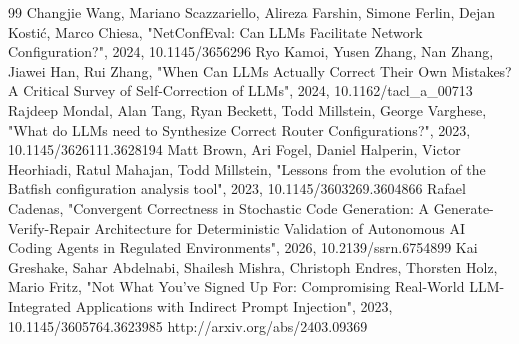 \documentclass[conference]{IEEEtran}
\begin{document}
\begin{thebibliography}{99}
 Changjie Wang, Mariano Scazzariello, Alireza Farshin, Simone Ferlin, Dejan Kostić, Marco Chiesa, "NetConfEval: Can LLMs Facilitate Network Configuration?", 2024, 10.1145/3656296
 Ryo Kamoi, Yusen Zhang, Nan Zhang, Jiawei Han, Rui Zhang, "When Can LLMs Actually Correct Their Own Mistakes? A Critical Survey of Self-Correction of LLMs", 2024, 10.1162/tacl\_a\_00713
 Rajdeep Mondal, Alan Tang, Ryan Beckett, Todd Millstein, George Varghese, "What do LLMs need to Synthesize Correct Router Configurations?", 2023, 10.1145/3626111.3628194
 Matt Brown, Ari Fogel, Daniel Halperin, Victor Heorhiadi, Ratul Mahajan, Todd Millstein, "Lessons from the evolution of the Batfish configuration analysis tool", 2023, 10.1145/3603269.3604866
 Rafael Cadenas, "Convergent Correctness in Stochastic Code Generation: A Generate-Verify-Repair Architecture for Deterministic Validation of Autonomous AI Coding Agents in Regulated Environments", 2026, 10.2139/ssrn.6754899
 Kai Greshake, Sahar Abdelnabi, Shailesh Mishra, Christoph Endres, Thorsten Holz, Mario Fritz, "Not What You've Signed Up For: Compromising Real-World LLM-Integrated Applications with Indirect Prompt Injection", 2023, 10.1145/3605764.3623985
 http://arxiv.org/abs/2403.09369
\end{thebibliography}
\end{document}
